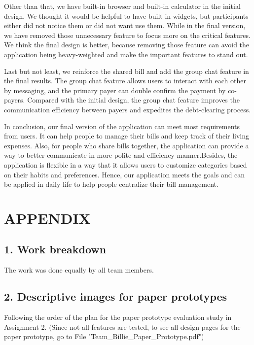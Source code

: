\documentclass{sigchi}
\begin{document}
Other than that, we have built-in browser and built-in calculator in the initial design. We thought it would be helpful to have built-in widgets, but participants either did not notice them or did not want use them. While in the final version, we have removed those unnecessary feature to focus more on the critical features. We think the final design is better, because removing those feature can avoid the application being heavy-weighted and make the important features to stand out.

Last but not least, we reinforce the shared bill and add the group chat feature in the final results. The group chat feature allows users to interact with each other by messaging, and the primary payer can double confirm the payment by co-payers. Compared with the initial design, the group chat feature improves the communication efficiency between payers and expedites the debt-clearing process. 


In conclusion, our final version of the application can meet most requirements from users. It can help people to manage their bills and keep track of their living expenses. Also, for people who share bills together, the application can provide a way to better communicate in more polite and efficiency manner.Besides, the application is flexible in a way that it allows users to customize categories based on their habits and preferences. Hence, our application meets the goals and can be applied in daily life to help people centralize their bill management. 







\newpage
\section{APPENDIX}

\subsection{1. Work breakdown}
 The work was done equally by all team members.

 \subsection{2. Descriptive images for paper prototypes}
 Following the order of the plan for the paper prototype evaluation study in Assignment 2. (Since not all features are tested, to see all design pages for the paper prototype, go to File "Team\_Billie\_Paper\_Prototype.pdf")
 
\end{document}

